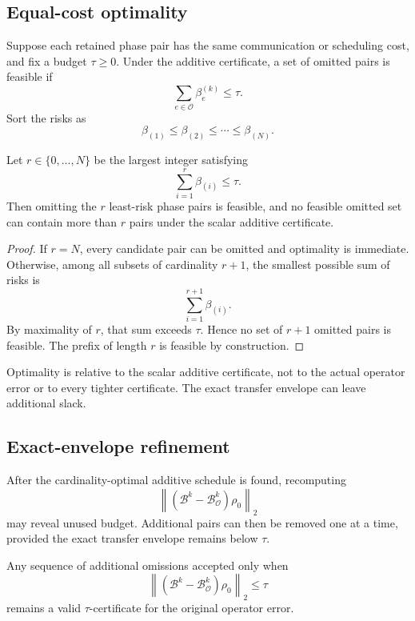 \subsection{Equal-cost optimality}

Suppose each retained phase pair has the same communication or scheduling
cost, and fix a budget $\tau\ge0$. Under the additive certificate, a set of
omitted pairs is feasible if
\[
\sum_{e\in\mathcal O}\beta_e^{(k)}\le\tau.
\]
Sort the risks as
\[
\beta_{(1)}\le\beta_{(2)}\le\cdots\le\beta_{(N)}.
\]

\begin{theorem}
\label{thm:unit-cost-optimal}
Let $r\in\{0,\ldots,N\}$ be the largest integer satisfying
\[
\sum_{i=1}^{r}\beta_{(i)}\le\tau.
\]
Then omitting the $r$ least-risk phase pairs is feasible, and no feasible
omitted set can contain more than $r$ pairs under the scalar additive
certificate.
\end{theorem}

\begin{proof}
If $r=N$, every candidate pair can be omitted and optimality is immediate.
Otherwise, among all subsets of cardinality $r+1$, the smallest possible sum
of risks is
\[
\sum_{i=1}^{r+1}\beta_{(i)}.
\]
By maximality of $r$, that sum exceeds $\tau$.  Hence no set of $r+1$ omitted
pairs is feasible.  The prefix of length $r$ is feasible by construction.
\end{proof}

Optimality is relative to the scalar additive certificate, not to the actual
operator error or to every tighter certificate. The exact transfer envelope
can leave additional slack.

\subsection{Exact-envelope refinement}

After the cardinality-optimal additive schedule is found, recomputing
\[
\left\lVert
(\mathcal B^k-\mathcal B_{\mathcal O}^k)\rho_0
\right\rVert_2
\]
may reveal unused budget.  Additional pairs can then be removed one at a time,
provided the exact transfer envelope remains below $\tau$.

\begin{proposition}\label{claim:final-16-5}
Any sequence of additional omissions accepted only when
\[
\left\lVert
(\mathcal B^k-\mathcal B_{\mathcal O}^k)\rho_0
\right\rVert_2\le\tau
\]
remains a valid $\tau$-certificate for the original operator error.
\end{proposition}


